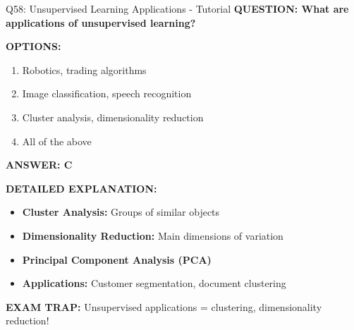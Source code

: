 \documentclass[8pt]{beamer}
\begin{document}
	\begin{frame}{Q58: Unsupervised Learning Applications - Tutorial}
		\fontsize{6.5}{7.5}\selectfont
		\textbf{QUESTION: What are applications of unsupervised learning?}
		
		\vspace{0.1cm}
		\textbf{OPTIONS:}
		\begin{enumerate}
			\item Robotics, trading algorithms
			\item Image classification, speech recognition
			\item Cluster analysis, dimensionality reduction
			\item All of the above
		\end{enumerate}
		
		\vspace{0.1cm}
		\textcolor{myblue}{\textbf{ANSWER: C}}
		
		\vspace{0.1cm}
		\textbf{DETAILED EXPLANATION:}
		\begin{itemize}
			\item \textbf{Cluster Analysis:} Groups of similar objects
			\item \textbf{Dimensionality Reduction:} Main dimensions of variation
			\item \textbf{Principal Component Analysis (PCA)}
			\item \textbf{Applications:} Customer segmentation, document clustering
		\end{itemize}
		
		\vspace{0.1cm}
		\textcolor{myred}{\textbf{EXAM TRAP:}} Unsupervised applications = \textcolor{myblue}{clustering, dimensionality reduction}!
	\end{frame}
	
\end{document}

